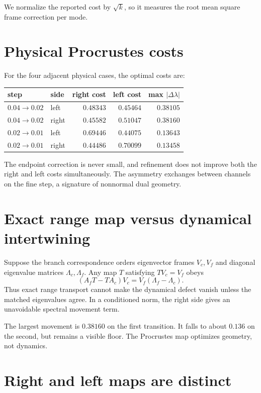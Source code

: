 \documentclass[12pt]{article}
\theoremstyle{remark}\newtheorem{remark}[theorem]{Remark}
\begin{document}
We normalize the reported cost by $\sqrt{k}$, so it measures the root mean
square frame correction per mode.

\section{Physical Procrustes costs}

For the four adjacent physical cases, the optimal costs are:
\begin{center}
\begin{tabular}{llrrr}
\toprule
step & side & right cost & left cost & max $|\Delta\lambda|$\\
\midrule
$0.04\to0.02$ & left  & $0.48343$ & $0.45464$ & $0.38105$\\
$0.04\to0.02$ & right & $0.45582$ & $0.51047$ & $0.38160$\\
$0.02\to0.01$ & left  & $0.69446$ & $0.44075$ & $0.13643$\\
$0.02\to0.01$ & right & $0.44486$ & $0.70099$ & $0.13458$\\
\bottomrule
\end{tabular}
\end{center}
The endpoint correction is never small, and refinement does not improve
both the right and left costs simultaneously.  The asymmetry exchanges
between channels on the fine step, a signature of nonnormal dual geometry.

\section{Exact range map versus dynamical intertwining}

Suppose the branch correspondence orders eigenvector frames $V_c,V_f$ and
diagonal eigenvalue matrices $\Lambda_c,\Lambda_f$.  Any map $T$ satisfying
$TV_c=V_f$ obeys
\begin{equation}\label{eq:dynamics}
 (A_fT-TA_c)V_c=V_f(\Lambda_f-\Lambda_c).
\end{equation}
Thus exact range transport cannot make the dynamical defect vanish unless
the matched eigenvalues agree.  In a conditioned norm, the right side gives
an unavoidable spectral movement term.

The largest movement is $0.38160$ on the first transition.  It falls to
about $0.136$ on the second, but remains a visible floor.  The Procrustes map
optimizes geometry, not dynamics.

\section{Right and left maps are distinct}
\end{document}
